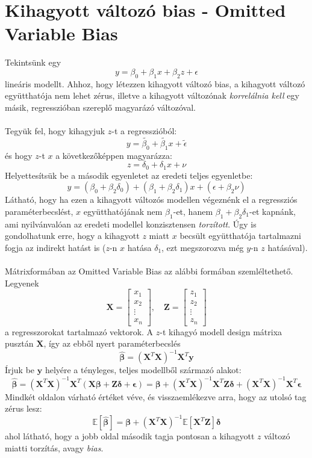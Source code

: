 \documentclass[14p]{report}
\def\pmb{\boldsymbol}
\def\ebeta{\hat{\pmb{\beta}}}
\def\e{\epsilon}
\newcounter{x}
\newcounter{y}
\newcounter{z}
\begin{document}
	\section{Kihagyott változó bias - Omitted Variable Bias}
	Tekintsünk egy 
	\[
		y = \beta_0 + \beta_1 x + \beta_2 z + \e
	\]
	lineáris modellt. Ahhoz, hogy létezzen kihagyott változó bias, a kihagyott változó együtthatója nem lehet zérus, illetve a kihagyott változónak \emph{korrelálnia kell} egy másik, regresszióban szereplő magyarázó változóval.
	\\
	\\
	Tegyük fel, hogy kihagyjuk $z$-t a regresszióból:
	\[
		y = \tilde{\beta_0} + \tilde{\beta_1} x + \tilde{\e}
	\]
	és hogy $z$-t $x$ a következőképpen magyarázza:
	\[
		z = \delta_0 + \delta_1 x + \nu
	\]
	Helyettesítsük be a második egyenletet az eredeti teljes egyenletbe:
	\[
		y = (\beta_0 + \beta_2 \delta_0) + (\beta_1 + \beta_2 \delta_1)x + (\e + \beta_2 \nu)
	\]
	Látható, hogy ha ezen a kihagyott változós modellen végeznénk el a regressziós paraméterbecslést, $x$ együtthatójának nem $\beta_1$-et, hanem $\beta_1 + \beta_2 \delta_1$-et kapnánk, ami nyilvánvalóan az eredeti modellel konzisztensen \emph{torzított}. Úgy is gondolhatunk erre, hogy a kihagyott $z$ miatt $x$ becsült együtthatója tartalmazni fogja az indirekt hatást is ($z$-n $x$ hatása $\delta_1$, ezt megszorozva még $y$-n $z$ hatásával).
	\\
	\\
	Mátrixformában az Omitted Variable Bias az alábbi formában szemléltethető. Legyenek
	\[
		\pmb{X} =
		\begin{bmatrix}
		x_1 \\
		x_2 \\
		\vdots \\
		x_n
		\end{bmatrix}, \quad
		\pmb{Z} =
		\begin{bmatrix}
		z_1 \\
		z_2 \\
		\vdots \\
		z_n 
		\end{bmatrix}
	\]
	a regresszorokat tartalmazó vektorok. A $z$-t kihagyó modell design mátrixa pusztán $\pmb{X}$, így az ebből nyert paraméterbecslés
	\[
		\ebeta = (\pmb{X}^T\pmb{X})^{-1}\pmb{X}^T\pmb{y}
	\] 
	Írjuk be $\pmb{y}$ helyére a tényleges, teljes modellből származó alakot:
	\[
		\ebeta = (\pmb{X}^T\pmb{X})^{-1}\pmb{X}^T(\pmb{X}\pmb{\beta} + \pmb{Z}\pmb{\delta} + \pmb{\e}) = \pmb{\beta} + (\pmb{X}^T\pmb{X})^{-1}\pmb{X}^T\pmb{Z}\pmb{\delta} + (\pmb{X}^T\pmb{X})^{-1}\pmb{X}^T\pmb{\e}
	\]
	Mindkét oldalon várható értéket véve, és visszaemlékezve arra, hogy az utolsó tag zérus lesz:
	\[
		\mathbb{E}[\ebeta] = \pmb{\beta} + (\pmb{X}^T\pmb{X})^{-1}\mathbb{E}[\pmb{X}^T\pmb{Z}]\pmb{\delta}
	\]
	ahol látható, hogy a jobb oldal második tagja pontosan a kihagyott $z$ változó miatti torzítás, avagy \emph{bias}.
	
\end{document}

